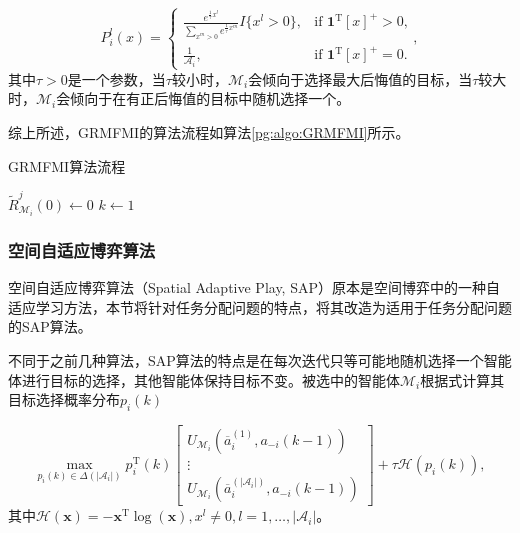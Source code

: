 \begin{equation}
	P_i^l(x) = 	
	\begin{cases}
		\frac{e^{\frac{1}{\tau} x^l}}{\sum_{x^m>0}e^{\frac{1}{\tau}x^m}} I\{x^l>0\}, & \text{if ${\bm 1}^{\mathrm T}[x]^+>0$,}\\
		\frac{1}{\mathcal{A}_i}, & \text{if ${\bm{1}}^{\mathrm T}[x]^+=0$.}
	\end{cases},
\end{equation}
其中$\tau>0$是一个参数，当$\tau$较小时，$\mathcal{M}_i$会倾向于选择最大后悔值的目标，当$\tau$较大时，$\mathcal{M}_i$会倾向于在有正后悔值的目标中随机选择一个。

综上所述，GRMFMI的算法流程如算法\ref{pg:algo:GRMFMI}所示。

\begin{algorithm}[htb]
	\caption{GRMFMI算法流程}
	\label{pg:algo:GRMFMI}
	\small
	\SetAlgoLined
	$\widetilde R_{\mathcal{M}_i}^j(0) \gets 0$\;
	$k \gets 1$\;
\end{algorithm}


\subsubsection{空间自适应博弈算法}
\label{pgta:protocal:sap}

空间自适应博弈算法（Spatial Adaptive Play, SAP）原本是空间博弈中的一种自适应学习方法，本节将针对任务分配问题的特点，将其改造为适用于任务分配问题的SAP算法。

不同于之前几种算法，SAP算法的特点是在每次迭代只等可能地随机选择一个智能体进行目标的选择，其他智能体保持目标不变。被选中的智能体$\mathcal{M}_i$根据式计算其目标选择概率分布$p_i(k)$

\begin{equation}
\label{pg:eq:MaxEntropy}
	\max_{p_i(k) \in \Delta(|\mathcal{A}_i|)} p_i^{\mathrm T}(k) \begin{bmatrix}
		U_{\mathcal{M}_i}(\overline a_i^{(1)},a_{-i}(k-1))\\ \vdots \\ U_{\mathcal{M}_i}(\overline a_i^{(|\mathcal{A}_i|)},a_{-i}(k-1))
	\end{bmatrix}
	+ \tau \mathcal{H}(p_i(k)),
\end{equation}
其中$\mathcal{H}({\bm x}) = -{\bm x}^{\mathrm T} \log({\bm x}), x^l \neq 0,l=1,\dots,|\mathcal{A}_i|$。

